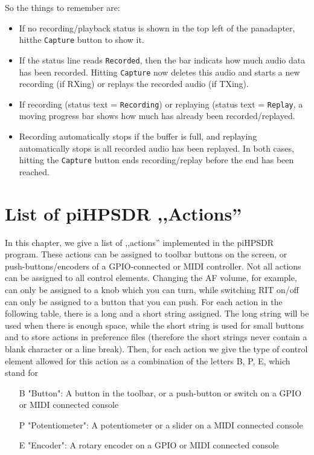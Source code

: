 \documentclass[12pt]{book}
\def\rett#1{\texttt{\color{red}#1}}
\def\bltt#1{\texttt{\color{blue}#1}}
\def\pH{pi\-HPSDR }
\begin{document}
So the things to remember are:
\begin{itemize}
\item{If no recording/playback status is shown in the top left of the panadapter, hitthe  \bltt{Capture} button
to show it.}
\item{If the status line reads \rett{Recorded}, then the bar indicats how much audio data has been recorded. Hitting
\bltt{Capture} now deletes this audio and starts a new recording (if RXing) or replays the recorded audio
(if TXing).}
\item{If recording (status text = \rett{Recording}) or replaying (status text = \rett{Replay}, a moving progress
bar shows how much has already been recorded/replayed.}
\item{Recording automatically stops if the buffer is full, and replaying automatically stops is all recorded audio
has been replayed. In both cases, hitting the \bltt{Capture} button ends recording/replay before the end has been reached.}
\end{itemize}


\appendix
\chapter{List of \pH ,,Actions''}
\label{sec:actionlist}

In this chapter, we give a list of ,,actions'' implemented in the \pH program. These actions can be
assigned to toolbar buttons on the screen, or push-buttons/encoders of a GPIO-connected or MIDI controller.
Not all actions can be assigned to all control elements. Changing the AF volume, for example, can only be
assigned to a knob
which you can turn, while switching RIT on/off can only be assigned to a button that you can push. For each
action in the following table, there is a long and a short string assigned. The long string will be used
when there is enough space, while the short string is used for small buttons and to store actions in
preference files (therefore the short strings never contain a blank character or a line break). Then, for
each action we give the type of control element allowed for this action as a combination of the letters B,
P, E, which stand for

\begin{itemize}[font=\texttt, left=0pt]
\item[B] {"Button": A button in the toolbar, or a push-button or switch on a GPIO or MIDI connected console}
\item[P] {"Potentiometer": A potentiometer or a slider on a MIDI connected console}
\item[E] {"Encoder": A rotary encoder on a GPIO or MIDI connected console}
\end{itemize}
\end{document}
